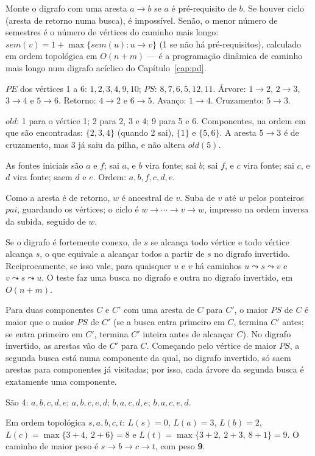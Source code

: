  Monte o digrafo com uma aresta $a\to b$ se $a$ é pré-requisito de $b$. Se houver ciclo (aresta de retorno numa busca), é impossível. Senão, o menor número de semestres é o número de vértices do caminho mais longo: $sem(v)=1+\max\{sem(u):u\to v\}$ (1 se não há pré-requisitos), calculado em ordem topológica em $O(n+m)$ --- é a programação dinâmica de caminho mais longo num digrafo acíclico do Capítulo~\ref{cap:pd}.

 $PE$ dos vértices 1 a 6: $1,2,3,4,9,10$; $PS$: $8,7,6,5,12,11$. Árvore: $1\to2$, $2\to3$, $3\to4$ e $5\to6$. Retorno: $4\to2$ e $6\to5$. Avanço: $1\to4$. Cruzamento: $5\to3$.

 $old$: 1 para o vértice 1; 2 para 2, 3 e 4; 9 para 5 e 6. Componentes, na ordem em que são encontradas: $\{2,3,4\}$ (quando 2 sai), $\{1\}$ e $\{5,6\}$. A aresta $5\to3$ é de cruzamento, mas 3 já saiu da pilha, e não altera $old(5)$.

 As fontes iniciais são $a$ e $f$; sai $a$, e $b$ vira fonte; sai $b$; sai $f$, e $c$ vira fonte; sai $c$, e $d$ vira fonte; saem $d$ e $e$. Ordem: $a,b,f,c,d,e$.

 Como a aresta é de retorno, $w$ é ancestral de $v$. Suba de $v$ até $w$ pelos ponteiros $pai$, guardando os vértices; o ciclo é $w\to\cdots\to v\to w$, impresso na ordem inversa da subida, seguido de $w$.

 Se o digrafo é fortemente conexo, de $s$ se alcança todo vértice e todo vértice alcança $s$, o que equivale a alcançar todos a partir de $s$ no digrafo invertido. Reciprocamente, se isso vale, para quaisquer $u$ e $v$ há caminhos $u\leadsto s\leadsto v$ e $v\leadsto s\leadsto u$. O teste faz uma busca no digrafo e outra no digrafo invertido, em $O(n+m)$.

 Para duas componentes $C$ e $C'$ com uma aresta de $C$ para $C'$, o maior $PS$ de $C$ é maior que o maior $PS$ de $C'$ (se a busca entra primeiro em $C$, termina $C'$ antes; se entra primeiro em $C'$, termina $C'$ inteira antes de alcançar $C$). No digrafo invertido, as arestas vão de $C'$ para $C$. Começando pelo vértice de maior $PS$, a segunda busca está numa componente da qual, no digrafo invertido, só saem arestas para componentes já visitadas; por isso, cada árvore da segunda busca é exatamente uma componente.

 São 4: $a,b,c,d,e$; $a,b,c,e,d$; $b,a,c,d,e$; $b,a,c,e,d$.

 Em ordem topológica $s,a,b,c,t$: $L(s)=0$, $L(a)=3$, $L(b)=2$, $L(c)=\max\{3+4,\ 2+6\}=8$ e $L(t)=\max\{3+2,\ 2+3,\ 8+1\}=9$. O caminho de maior peso é $s\to b\to c\to t$, com peso \textbf{9}.

